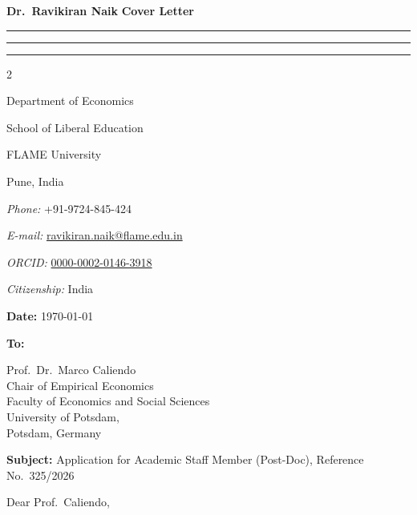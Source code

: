 \documentclass[11pt,english]{article}
\newcommand{\makeheading}[2]%
        {\hspace*{-\marginparsep minus \marginparwidth}%
         \begin{minipage}[t]{\textwidth\marginparwidth\marginparsep}%
         {\LARGE\bfseries #1} \hfill  {\LARGE\bfseries #2 \hspace*{-2.3\marginparsep minus \marginparwidth}}\\[-0.2\baselineskip]%
                 \rule{\textwidth}{1.5pt}\rule{\marginparsep}{1.5pt}\rule{\marginparwidth}{1.5pt}%
         \end{minipage}}
\newcommand{\UP}{University of Potsdam}
\begin{document}
\makeheading{Dr.\ Ravikiran Naik}{Cover Letter}


\begin{multicols}{2}

\begin{flushleft}
Department of Economics

School of Liberal Education

FLAME University
 
Pune, India

\end{flushleft}


\begin{flushright}
\textit{Phone:} +91-9724-845-424

\textit{E-mail:} \href{mailto:ravikiran.naik@flame.edu.in}{ravikiran.naik@flame.edu.in}

\textit{ORCID:} \href{https://orcid.org/0000-0002-0146-3918}{0000-0002-0146-3918}

\textit{Citizenship:} India

\end{flushright}

\end{multicols}

\vspace{-.15in}

\hfill \textbf{Date:} \today

\vspace{0.15in}

\textbf{To:}

Prof.\ Dr.\ Marco Caliendo \\
Chair of Empirical Economics \\
Faculty of Economics and Social Sciences \\
\UP, \\
Potsdam, Germany

\vspace{0.15in}

\textbf{Subject:} Application for Academic Staff Member (Post-Doc), Reference No.\ 325/2026

\vspace{0.15in}

Dear Prof.\ Caliendo,

\vspace{0.1in}
\end{document}
